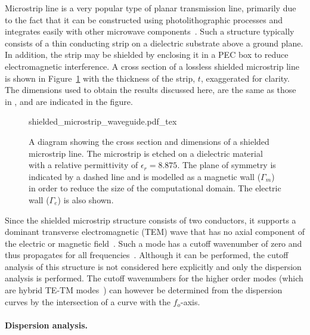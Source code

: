 Microstrip line is a very popular type of planar transmission
line, primarily due to the fact that it can be constructed using
photolithographic processes and integrates easily with other microwave
components~\citep{Pozar2005}. Such a structure typically consists of a
thin conducting strip on a dielectric substrate above a ground plane. In
addition, the strip may be shielded by enclosing it in a PEC box to reduce
electromagnetic interference. A cross section of a lossless shielded
microstrip line is shown in Figure~\ref{fig:lezar:shielded_microstrip}
with the thickness of the strip, $t$, exaggerated for clarity. The
dimensions used to obtain the results discussed here, are the same as
those in \citet{PelosiCoccioliSelleri1998}, and are indicated in the figure.
\begin{figure}
    \centering
    \def\svgwidth{\smallfig}
    {shielded_microstrip_waveguide.pdf_tex}
    \caption{A diagram showing the cross section and dimensions of a
    shielded microstrip line. The microstrip is etched on a dielectric
    material with a relative permittivity of $\epsilon_r = 8.875$. The
    plane of symmetry is indicated by a dashed line and is modelled
    as a magnetic wall ($\Gamma_m$) in order to reduce the size of the
    computational domain. The electric wall ($\Gamma_e$) is also shown.}
    \label{fig:lezar:shielded_microstrip}
\end{figure}

Since the shielded microstrip structure consists of two
conductors, it supports a dominant transverse electromagnetic
(TEM) wave that has no axial component of the electric or
magnetic field~\citep{Pozar2005}. Such a mode has a cutoff
wavenumber of zero and thus propagates for all
frequencies~\citep{Jin2002,PelosiCoccioliSelleri1998}. Although it can
be performed, the cutoff analysis of this structure is not considered
here explicitly and only the dispersion analysis is performed. The
cutoff wavenumbers for the higher order modes (which are hybrid TE-TM
modes~\citep{Pozar2005}) can however be determined from the dispersion
curves by the intersection of a curve with the $f_o$-axis.

\paragraph{Dispersion analysis.}

